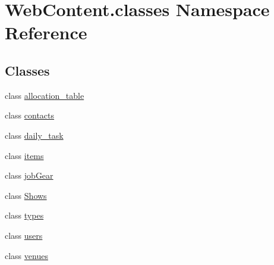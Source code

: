 \hypertarget{namespace_web_content_1_1classes}{}\section{Web\+Content.\+classes Namespace Reference}
\label{namespace_web_content_1_1classes}
\subsection*{Classes}
\begin{DoxyCompactItemize}
\item 
class \hyperlink{class_web_content_1_1classes_1_1allocation__table}{allocation\+\_\+table}
\item 
class \hyperlink{class_web_content_1_1classes_1_1contacts}{contacts}
\item 
class \hyperlink{class_web_content_1_1classes_1_1daily__task}{daily\+\_\+task}
\item 
class \hyperlink{class_web_content_1_1classes_1_1items}{items}
\item 
class \hyperlink{class_web_content_1_1classes_1_1job_gear}{job\+Gear}
\item 
class \hyperlink{class_web_content_1_1classes_1_1_shows}{Shows}
\item 
class \hyperlink{class_web_content_1_1classes_1_1types}{types}
\item 
class \hyperlink{class_web_content_1_1classes_1_1users}{users}
\item 
class \hyperlink{class_web_content_1_1classes_1_1venues}{venues}
\end{DoxyCompactItemize}
